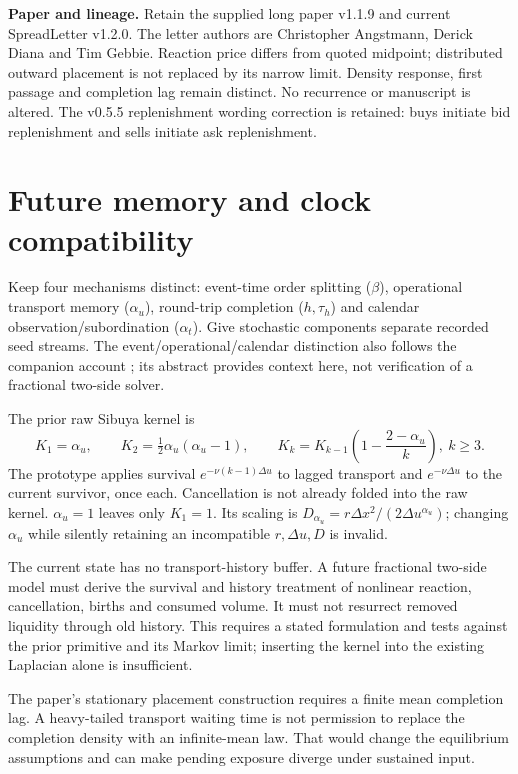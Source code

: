 \documentclass[11pt,a4paper]{article}
\newcommand{\du}{\Delta u}\newcommand{\dx}{\Delta x}
\begin{document}
\textbf{Paper and lineage.} Retain the supplied long paper v1.1.9 and current SpreadLetter v1.2.0.
The letter authors are Christopher Angstmann, Derick Diana and Tim Gebbie. Reaction price differs
from quoted midpoint; distributed outward placement is not replaced by its
narrow limit. Density response, first passage and completion lag remain distinct.
No recurrence or manuscript is altered. The v0.5.5 replenishment wording correction
is retained: buys initiate bid replenishment and sells initiate ask replenishment.

\newpage
\section{Future memory and clock compatibility}
Keep four mechanisms distinct: event-time order splitting ($\beta$),
operational transport memory ($\alpha_u$), round-trip completion ($h,\tau_h$)
and calendar observation/subordination ($\alpha_t$). Give stochastic
components separate recorded seed streams. The event/operational/calendar
distinction also follows the companion account \cite{clocks}; its abstract
provides context here, not verification of a fractional two-side solver.

The prior raw Sibuya kernel is
\[
 K_1=\alpha_u,\qquad K_2=\tfrac12\alpha_u(\alpha_u-1),\qquad
 K_k=K_{k-1}\left(1-\frac{2-\alpha_u}{k}\right),\ k\geq3.
\]
The prototype applies survival $e^{-\nu(k-1)\du}$ to lagged transport
and $e^{-\nu\du}$ to the current survivor, once each. Cancellation is not
already folded into the raw kernel. $\alpha_u=1$ leaves only $K_1=1$.
Its scaling is $D_{\alpha_u}=r\dx^2/(2\du^{\alpha_u})$; changing
$\alpha_u$ while silently retaining an incompatible $r,\du,D$ is invalid.

The current state has no transport-history buffer. A future fractional
two-side model must derive the survival and history treatment of nonlinear
reaction, cancellation, births and consumed volume. It must not resurrect
removed liquidity through old history. This requires a stated formulation
and tests against the prior primitive and its Markov limit; inserting the
kernel into the existing Laplacian alone is insufficient.

The paper's stationary placement construction requires a finite mean
completion lag. A heavy-tailed transport waiting time is not permission to
replace the completion density with an infinite-mean law. That would change
the equilibrium assumptions and can make pending exposure diverge under
sustained input.
\end{document}
